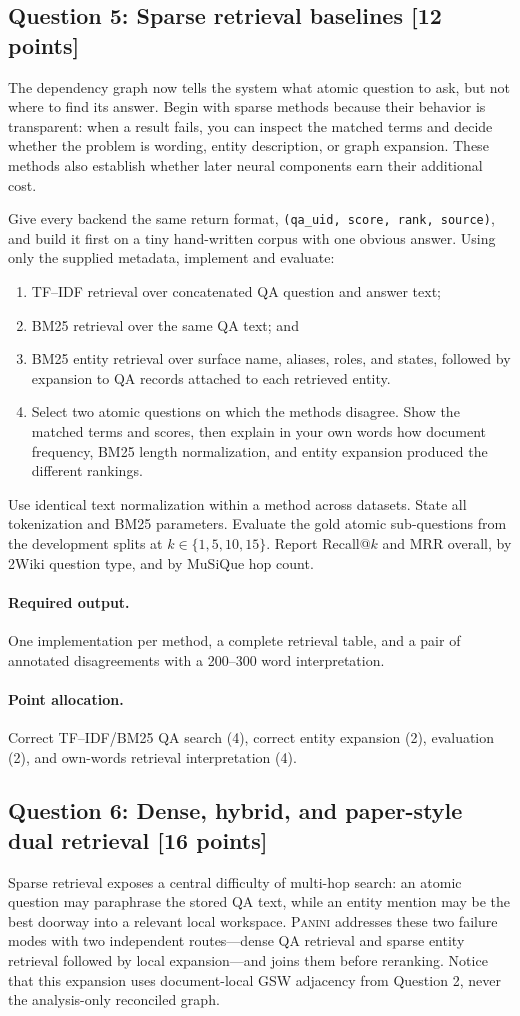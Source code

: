 \documentclass[11pt]{article}
\newcommand{\code}[1]{\texttt{#1}}
\newcommand{\PANINI}{{\mdseries\textsc{Panini}}\xspace}
\newcommand{\question}[3]{%
  \subsection[Question #1: #2 (#3 points)]{Question #1: #2 \hfill [#3 points]}%
}
\newcommand{\deliverables}{\paragraph{Required output.}}
\newcommand{\grading}{\paragraph{Point allocation.}}
\begin{document}
\question{5}{Sparse retrieval baselines}{12}

The dependency graph now tells the system what atomic question to ask, but not
where to find its answer. Begin with sparse methods because their behavior is
transparent: when a result fails, you can inspect the matched terms and decide
whether the problem is wording, entity description, or graph expansion. These
methods also establish whether later neural components earn their additional
cost.

Give every backend the same return format,
\code{(qa\_uid, score, rank, source)}, and build it first on a tiny hand-written
corpus with one obvious answer. Using only the supplied metadata, implement
and evaluate:

\begin{enumerate}[label=(\alph*)]
  \item TF--IDF retrieval over concatenated QA question and answer text;
  \item BM25 retrieval over the same QA text; and
  \item BM25 entity retrieval over surface name, aliases, roles, and states,
        followed by expansion to QA records attached to each retrieved entity.
  \item Select two atomic questions on which the methods disagree. Show the
        matched terms and scores, then explain in your own words how document
        frequency, BM25 length normalization, and entity expansion produced
        the different rankings.
\end{enumerate}

Use identical text normalization within a method across datasets. State all
tokenization and BM25 parameters. Evaluate the gold atomic sub-questions from
the development splits at $k\in\{1,5,10,15\}$. Report Recall@$k$ and MRR
overall, by 2Wiki question type, and by MuSiQue hop count.

\deliverables One implementation per method, a complete retrieval table, and
a pair of annotated disagreements with a 200--300 word interpretation.

\grading Correct TF--IDF/BM25 QA search (4), correct entity expansion (2),
evaluation (2), and own-words retrieval interpretation (4).

\question{6}{Dense, hybrid, and paper-style dual retrieval}{16}

Sparse retrieval exposes a central difficulty of multi-hop search: an atomic
question may paraphrase the stored QA text, while an entity mention may be the
best doorway into a relevant local workspace. \PANINI addresses these two
failure modes with two independent routes---dense QA retrieval and sparse
entity retrieval followed by local expansion---and joins them before
reranking. Notice that this expansion uses document-local GSW adjacency from
Question 2, never the analysis-only reconciled graph.
\end{document}
